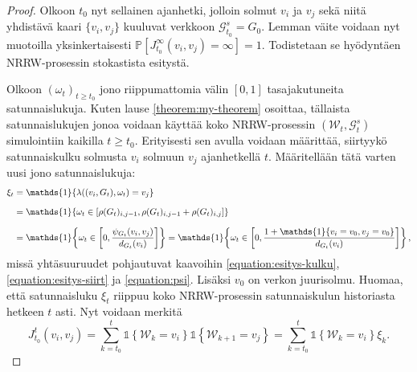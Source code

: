 \documentclass[finnish, 12pt, a4paper, sci, utf8, pdfa]{aaltothesis}
\newcommand{\Grandom}{\mathcal{G}}
\newcommand{\Wrandom}{\mathcal{W}}
\newcommand{\indicator}{\mathopen{\mathds{1}}}
\newcommand*{\prob}{\mathbb{P}}
\begin{document}
\begin{proof}
   Olkoon $ t_{0} $ nyt sellainen ajanhetki, jolloin solmut $ v_{i} $ ja $ v_{j} $ sekä niitä yhdistävä kaari $ \{ v_{i}, v_{j} \} $ kuuluvat verkkoon $ \Grandom_{t_{0}}^{s} = G_{0} $.
   Lemman väite voidaan nyt muotoilla yksinkertaisesti $ \prob \left[ J_{t_{0}}^{\infty}(v_{i}, v_{j}) = \infty \right] = 1. $ Todistetaan se hyödyntäen NRRW-prosessin stokastista esitystä.

   Olkoon $ (\omega_{t})_{t \geq t_{0}} $ jono riippumattomia välin $ [0, 1] $ tasajakutuneita satunnaislukuja. Kuten lause \ref{theorem:my-theorem} osoittaa, tällaista satunnaislukujen
   jonoa voidaan käyttää koko NRRW-prosessin $ (\Wrandom_{t}, \Grandom_{t}^{s}) $ simulointiin kaikilla $ t \geq t_{0} $. Erityisesti sen avulla voidaan määrittää, siirtyykö satunnaiskulku
   solmusta $ v_{i} $ solmuun $ v_{j} $ ajanhetkellä $ t $. Määritellään tätä varten uusi jono satunnaislukuja:
   \begin{equation*}
      \setlength{\jot}{10pt}
      \begin{aligned}
      \xi_{t} &= \indicator \left\{ \lambda((v_{i}, G_{t}), \omega_{t}) = v_{j} \right\} \\
              &= \indicator \left\{ \omega_{t} \in \left[ \rho(G_{t})_{i,j-1}, \rho(G_{t})_{i,j-1} + \rho(G_{t})_{i,j} \right] \right\} \\
              &= \indicator \left\{ \omega_{t} \in \left[ 0, \frac{\psi_{G_{t}}(v_{i}, v_{j})}{d_{G_{t}}(v_{i})} \right] \right\} 
              = \indicator \left\{ \omega_{t} \in \left[ 0, \frac{1 + \indicator \{ v_{i} = v_{0}, v_{j} = v_{0} \}}{d_{G_{t}}(v_{i})} \right] \right\},
      \end{aligned}
   \end{equation*}
   missä yhtäsuuruudet pohjautuvat kaavoihin \ref{equation:esitys-kulku}, \ref{equation:esitys-siirt} ja \ref{equation:psi}. Lisäksi $ v_{0} $ on verkon juurisolmu. Huomaa, että satunnaisluku
   $ \xi_{t} $ riippuu koko NRRW-prosessin satunnaiskulun historiasta hetkeen $ t $ asti. Nyt voidaan merkitä
   \[
      J_{t_{0}}^{t}(v_{i}, v_{j}) = \sum_{k = t_{0}}^{t} \indicator \left\{ \Wrandom_{k} = v_{i} \right\} \indicator \left\{ \Wrandom_{k+1} = v_{j} \right\} 
      = \sum_{k = t_{0}}^{t} \indicator \left\{ \Wrandom_{k} = v_{i} \right\} \xi_{k}.
   \]


\end{proof}
\end{document}
